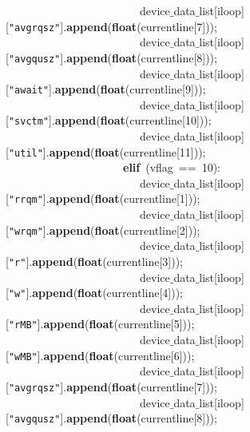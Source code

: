 \mbox{}\ \ \ \ \ \ \ \ \ \ \ \ \ \ \ \ \ \ \ \ \ \ \ \ device$\_$data$\_$list[iloop][\texttt{"{}avgrqsz"{}}].\textbf{append}(\textbf{float}(currentline[7])); \\
\mbox{}\ \ \ \ \ \ \ \ \ \ \ \ \ \ \ \ \ \ \ \ \ \ \ \ device$\_$data$\_$list[iloop][\texttt{"{}avgqusz"{}}].\textbf{append}(\textbf{float}(currentline[8])); \\
\mbox{}\ \ \ \ \ \ \ \ \ \ \ \ \ \ \ \ \ \ \ \ \ \ \ \ device$\_$data$\_$list[iloop][\texttt{"{}await"{}}].\textbf{append}(\textbf{float}(currentline[9])); \\
\mbox{}\ \ \ \ \ \ \ \ \ \ \ \ \ \ \ \ \ \ \ \ \ \ \ \ device$\_$data$\_$list[iloop][\texttt{"{}svctm"{}}].\textbf{append}(\textbf{float}(currentline[10])); \\
\mbox{}\ \ \ \ \ \ \ \ \ \ \ \ \ \ \ \ \ \ \ \ \ \ \ \ device$\_$data$\_$list[iloop][\texttt{"{}util"{}}].\textbf{append}(\textbf{float}(currentline[11]));\  \\
\mbox{}\ \ \ \ \ \ \ \ \ \ \ \ \ \ \ \ \ \ \ \ \ \textbf{elif}\ (vflag\ ==\ 10): \\
\mbox{}\ \ \ \ \ \ \ \ \ \ \ \ \ \ \ \ \ \ \ \ \ \ \ \ device$\_$data$\_$list[iloop][\texttt{"{}rrqm"{}}].\textbf{append}(\textbf{float}(currentline[1])); \\
\mbox{}\ \ \ \ \ \ \ \ \ \ \ \ \ \ \ \ \ \ \ \ \ \ \ \ device$\_$data$\_$list[iloop][\texttt{"{}wrqm"{}}].\textbf{append}(\textbf{float}(currentline[2])); \\
\mbox{}\ \ \ \ \ \ \ \ \ \ \ \ \ \ \ \ \ \ \ \ \ \ \ \ device$\_$data$\_$list[iloop][\texttt{"{}r"{}}].\textbf{append}(\textbf{float}(currentline[3])); \\
\mbox{}\ \ \ \ \ \ \ \ \ \ \ \ \ \ \ \ \ \ \ \ \ \ \ \ device$\_$data$\_$list[iloop][\texttt{"{}w"{}}].\textbf{append}(\textbf{float}(currentline[4])); \\
\mbox{}\ \ \ \ \ \ \ \ \ \ \ \ \ \ \ \ \ \ \ \ \ \ \ \ device$\_$data$\_$list[iloop][\texttt{"{}rMB"{}}].\textbf{append}(\textbf{float}(currentline[5])); \\
\mbox{}\ \ \ \ \ \ \ \ \ \ \ \ \ \ \ \ \ \ \ \ \ \ \ \ device$\_$data$\_$list[iloop][\texttt{"{}wMB"{}}].\textbf{append}(\textbf{float}(currentline[6])); \\
\mbox{}\ \ \ \ \ \ \ \ \ \ \ \ \ \ \ \ \ \ \ \ \ \ \ \ device$\_$data$\_$list[iloop][\texttt{"{}avgrqsz"{}}].\textbf{append}(\textbf{float}(currentline[7])); \\
\mbox{}\ \ \ \ \ \ \ \ \ \ \ \ \ \ \ \ \ \ \ \ \ \ \ \ device$\_$data$\_$list[iloop][\texttt{"{}avgqusz"{}}].\textbf{append}(\textbf{float}(currentline[8])); \\
